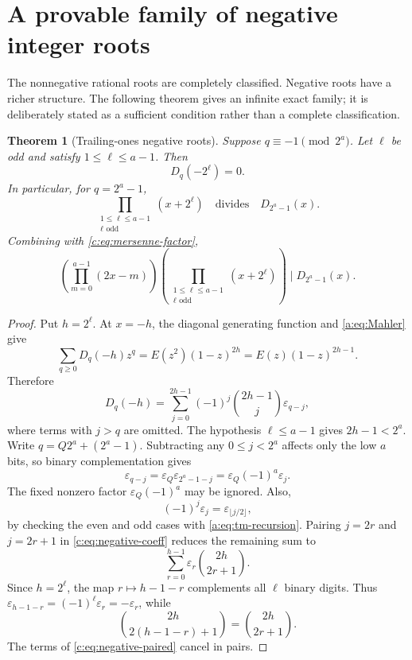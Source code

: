 \documentclass[11pt,a4paper,oneside,openany]{book}
\numberwithin{equation}{chapter}
\newtheorem{theorem}{Theorem}[chapter]
\theoremstyle{definition}
\theoremstyle{remark}
\newcommand{\eps}{\varepsilon}
\newcommand{\K}{E}
\newcommand{\Diag}{D}
\begin{document}
\section{A provable family of negative integer roots}

The nonnegative rational roots are completely classified.  Negative roots
have a richer structure.  The following theorem gives an infinite exact
family; it is deliberately stated as a sufficient condition rather than a
complete classification.

\begin{theorem}[Trailing-ones negative roots]\label{c:thm:negative-family}
Suppose \(q\equiv-1\pmod{2^a}\).  Let \(\ell\) be odd and satisfy
\(1\leq\ell\leq a-1\).  Then
\begin{equation}
 \Diag_q(-2^\ell)=0.                                       \label{c:eq:negative-family}
\end{equation}
In particular, for \(q=2^a-1\),
\begin{equation}
 \prod_{\substack{1\leq\ell\leq a-1\\\ell\text{ odd}}}
 (x+2^\ell)
 \quad\text{divides}\quad \Diag_{2^a-1}(x).               \label{c:eq:negative-mersenne-factor}
\end{equation}
Combining with \cref{c:eq:mersenne-factor},
\begin{equation}
 \left(\prod_{m=0}^{a-1}(2x-m)\right)
 \left(\prod_{\substack{1\leq\ell\leq a-1\\\ell\text{ odd}}}
 (x+2^\ell)\right)
 \mid\Diag_{2^a-1}(x).                                    \label{c:eq:combined-mersenne-factor}
\end{equation}
\end{theorem}

\begin{proof}
Put \(h=2^\ell\).  At \(x=-h\), the diagonal generating function and
\cref{a:eq:Mahler} give
\[
 \sum_{q\geq0}\Diag_q(-h)z^q
 =\K(z^2)(1-z)^{2h}
 =\K(z)(1-z)^{2h-1}.
\]
Therefore
\begin{equation}
 \Diag_q(-h)=\sum_{j=0}^{2h-1}
 (-1)^j\binom{2h-1}{j}\eps_{q-j},                         \label{c:eq:negative-coeff}
\end{equation}
where terms with \(j>q\) are omitted.  The hypothesis
\(\ell\leq a-1\) gives \(2h-1<2^a\).  Write
\(q=Q2^a+(2^a-1)\).  Subtracting any \(0\leq j<2^a\) affects only the low
\(a\) bits, so binary complementation gives
\[
 \eps_{q-j}=\eps_Q\eps_{2^a-1-j}
 =\eps_Q(-1)^a\eps_j.
\]
The fixed nonzero factor \(\eps_Q(-1)^a\) may be ignored.  Also,
\[
 (-1)^j\eps_j=\eps_{\lfloor j/2\rfloor},
\]
by checking the even and odd cases with \cref{a:eq:tm-recursion}.  Pairing
\(j=2r\) and \(j=2r+1\) in \cref{c:eq:negative-coeff} reduces the remaining
sum to
\begin{equation}
 \sum_{r=0}^{h-1}\eps_r\binom{2h}{2r+1}.                  \label{c:eq:negative-paired}
\end{equation}
Since \(h=2^\ell\), the map \(r\mapsto h-1-r\) complements all \(\ell\)
binary digits.  Thus
\(\eps_{h-1-r}=(-1)^\ell\eps_r=-\eps_r\), while
\[
 \binom{2h}{2(h-1-r)+1}=\binom{2h}{2r+1}.
\]
The terms of \cref{c:eq:negative-paired} cancel in pairs.
\end{proof}
\end{document}
